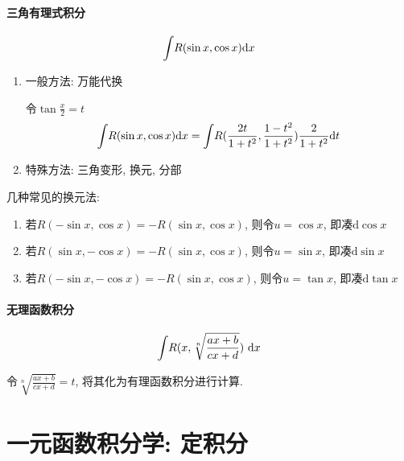 \subsubsection{三角有理式积分}
\begin{equation*}
    \displaystyle\int_{}\hspace{.2em}R(\sin x, \cos x)\mathrm{d}x
\end{equation*}\par
\begin{enumerate}
    \item 一般方法: 万能代换 \par
          令$ \tan \frac{x}{2}=t $
          \begin{equation*}
              \displaystyle\int_{}\hspace{.2em}R(\sin x, \cos x)\mathrm{d}x=\displaystyle\int_{}\hspace{.2em}R(\frac{2t}{1+t^{2}}, \frac{1-t^{2}}{1+t^{2}})\frac{2}{1+t^{2}}\mathrm{d}t
          \end{equation*}
    \item 特殊方法: 三角变形, 换元, 分部
\end{enumerate}
\begin{tcolorbox}
    几种常见的换元法:
    \begin{enumerate}
        \item 若$ R(-\sin x, \cos x)=-R(\sin x, \cos x) $, 则令$ u=\cos x $, 即凑$ \mathrm{d}\cos x $
        \item 若$ R(\sin x, -\cos x)=-R(\sin x, \cos x) $, 则令$ u=\sin x $, 即凑$ \mathrm{d}\sin x $
        \item 若$ R(-\sin x, -\cos x)=-R(\sin x, \cos x) $, 则令$ u=\tan x $, 即凑$ \mathrm{d}\tan x $
    \end{enumerate}
\end{tcolorbox}
\subsubsection{无理函数积分}
\begin{equation*}
    \displaystyle\int_{}\hspace{.2em}R(x, \sqrt[n]{\frac{ax+b}{cx+d}})\ \mathrm{d}x
\end{equation*}\par
令$ \sqrt[n]{\frac{ax+b}{cx+d}}=t $, 将其化为有理函数积分进行计算.
\chapter{一元函数积分学: 定积分}
